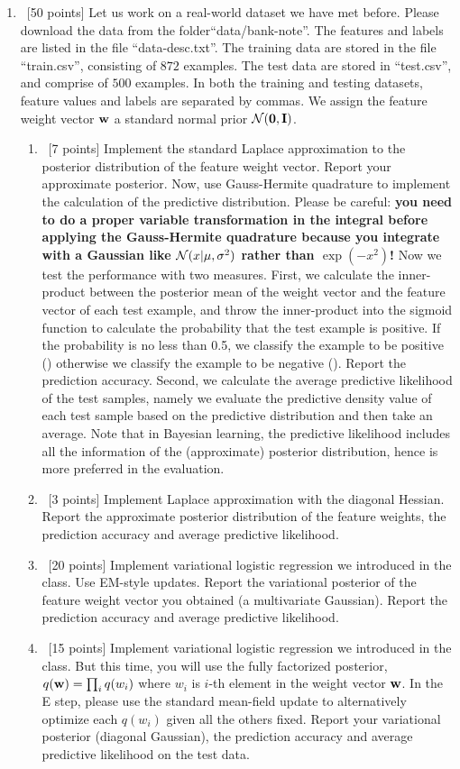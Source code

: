 \documentclass[12pt, fullpage,letterpaper]{article}
\begin{document}
\begin{enumerate}
	\item~[50 points] Let us work on a real-world dataset we have met before. Please download the data from the folder``data/bank-note''. The features and labels are listed in the file ``data-desc.txt''. The training data are stored in the file ``train.csv'', consisting of $872$ examples. The test data are stored in ``test.csv'', and comprise of $500$ examples. In both the training and testing datasets, feature values and labels are separated by commas. We assign the feature weight vector ${\bf w}$ a standard normal prior $\mathcal{N}({\bf 0}, {\bf I})$.  
	\begin{enumerate}
		\item~[7 points] Implement the standard Laplace approximation to the posterior distribution of the feature weight vector. Report your approximate posterior. Now, use Gauss-Hermite quadrature to implement the calculation of the predictive distribution. Please be careful: \textbf{you need to do a proper variable transformation in the integral before applying the Gauss-Hermite quadrature because you integrate  with a Gaussian like $\mathcal{N}(x|\mu, \sigma^2)$ rather than $\exp(-x^2)$!} Now we test the performance with two measures. First, we calculate the inner-product between the posterior mean of the weight vector and the feature vector of each test example, and throw the inner-product into the sigmoid function to calculate the probability that the test example is positive. If the probability is no less than 0.5, we classify the example to be positive () otherwise we classify the example to be negative (). Report the prediction accuracy. Second, we calculate the average predictive likelihood of the test samples, namely we evaluate the predictive density value of each test sample based on the predictive distribution and then take an average.  Note that in Bayesian learning, the predictive likelihood includes all the information of the (approximate) posterior distribution, hence is more preferred in the evaluation. 
		\item~[3 points] Implement Laplace approximation with the diagonal Hessian. Report the approximate posterior distribution of the feature weights, the prediction accuracy and average predictive likelihood. 
		\item~[20 points] Implement variational logistic regression we introduced in the class. Use EM-style updates. Report the variational posterior of the feature weight vector you obtained (\ie a multivariate Gaussian). Report the prediction accuracy and average predictive likelihood. 
		\item~[15 points] Implement variational logistic regression we introduced in the class.  But this time, you will use the fully factorized posterior,   $q({\bf w})= \prod_i q(w_i)$ where $w_i$ is $i$-th element in the weight vector ${\bf w}$. In the E step, please use the standard mean-field update to alternatively optimize each $q(w_i)$ given all the others fixed. Report your variational posterior (\ie diagonal Gaussian), the prediction accuracy and average predictive likelihood on the test data.  
		

\end{enumerate}
\end{enumerate}
\end{document}
